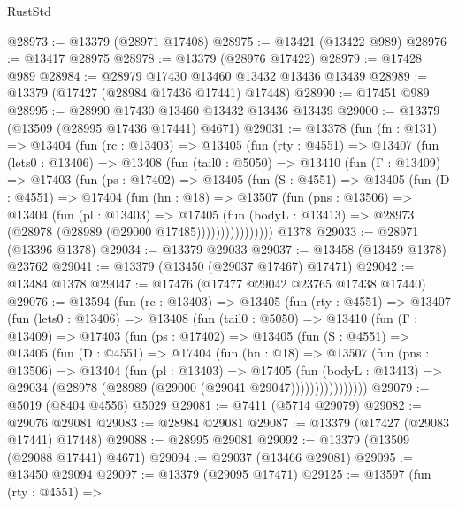 \begin{lexlean}{RustStd}
\begin{coremodule}
@28973 := @13379 (@28971 @17408)
@28975 := @13421 (@13422 @989)
@28976 := @13417 @28975
@28978 := @13379 (@28976 @17422)
@28979 := @17428 @989
@28984 := @28979 @17430 @13460 @13432 @13436 @13439
@28989 := @13379 (@17427 (@28984 @17436 @17441) @17448)
@28990 := @17451 @989
@28995 := @28990 @17430 @13460 @13432 @13436 @13439
@29000 := @13379 (@13509 (@28995 @17436 @17441) @4671)
@29031 := @13378
    (fun (fn : @131) =>
    @13404
      (fun (rc : @13403) =>
      @13405
        (fun (rty : @4551) =>
        @13407
          (fun (lets0 : @13406) =>
          @13408
            (fun (tail0 : @5050) =>
            @13410
              (fun (Γ : @13409) =>
              @17403
                (fun (ps : @17402) =>
                @13405
                  (fun (S : @4551) =>
                  @13405
                    (fun (D : @4551) =>
                    @17404
                      (fun (hn : @18) =>
                      @13507
                        (fun (pns : @13506) =>
                        @13404
                          (fun (pl : @13403) =>
                          @17405
                            (fun (bodyL : @13413) =>
                            @28973 (@28978 (@28989 (@29000 @17485))))))))))))))))
    @1378
@29033 := @28971 (@13396 @1378)
@29034 := @13379 @29033
@29037 := @13458 (@13459 @1378) @23762
@29041 := @13379 (@13450 (@29037 @17467) @17471)
@29042 := @13484 @1378
@29047 := @17476 (@17477 @29042 @23765 @17438 @17440)
@29076 := @13594
    (fun (rc : @13403) =>
    @13405
      (fun (rty : @4551) =>
      @13407
        (fun (lets0 : @13406) =>
        @13408
          (fun (tail0 : @5050) =>
          @13410
            (fun (Γ : @13409) =>
            @17403
              (fun (ps : @17402) =>
              @13405
                (fun (S : @4551) =>
                @13405
                  (fun (D : @4551) =>
                  @17404
                    (fun (hn : @18) =>
                    @13507
                      (fun (pns : @13506) =>
                      @13404
                        (fun (pl : @13403) =>
                        @17405
                          (fun (bodyL : @13413) =>
                          @29034 (@28978 (@28989 (@29000 (@29041 @29047))))))))))))))))
@29079 := @5019 (@8404 @4556) @5029
@29081 := @7411 (@5714 @29079)
@29082 := @29076 @29081
@29083 := @28984 @29081
@29087 := @13379 (@17427 (@29083 @17441) @17448)
@29088 := @28995 @29081
@29092 := @13379 (@13509 (@29088 @17441) @4671)
@29094 := @29037 (@13466 @29081)
@29095 := @13450 @29094
@29097 := @13379 (@29095 @17471)
@29125 := @13597
    (fun (rty : @4551) =>

\end{coremodule}
\end{lexlean}
